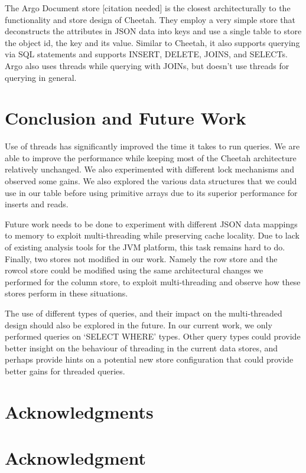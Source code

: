 \documentclass[11pt,journal,compsoc]{IEEEtran}
\begin{document}
The Argo Document store [citation needed] is the closest architecturally to the functionality and store design of Cheetah. They employ a very simple store that deconstructs the attributes in JSON data into keys and use a single table to store the object id, the key and its value. Similar to Cheetah, it also supports querying via SQL statements and supports INSERT, DELETE, JOINS, and SELECTs. Argo also uses threads while querying with JOINs, but doesn’t use threads for querying in general.


\section{Conclusion and Future Work}
Use of threads has significantly improved the time it takes to run queries. We are able to improve the performance while keeping most of the Cheetah architecture relatively unchanged. We also experimented with different lock mechanisms and observed some gains. We also explored the various data structures that we could use in our table before using primitive arrays due to its superior performance for inserts and reads.

Future work needs to be done to experiment with different JSON data mappings to memory to exploit multi-threading while preserving cache locality. Due to lack of existing analysis tools for the JVM platform, this task remains hard to do. Finally, two stores not modified in our work. Namely the row store and the rowcol store could be modified using the same architectural changes we performed for the column store, to exploit multi-threading and observe how these stores perform in these situations.

The use of different types of queries, and their impact on the multi-threaded design should also be explored in the future. In our current work, we only performed queries on ‘SELECT WHERE’ types. Other query types could provide better insight on the behaviour of threading in the current data stores, and perhaps provide hints on a potential new store configuration that could provide better gains for threaded queries. 


\ifCLASSOPTIONcompsoc
  \section*{Acknowledgments}
\else
  \section*{Acknowledgment}
\fi
\end{document}

